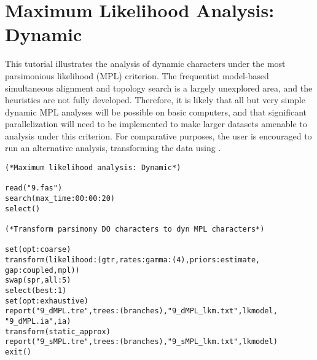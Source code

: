 
\section{Maximum Likelihood Analysis: Dynamic}{\label{tutorial15}}
This tutorial illustrates the analysis of dynamic characters under the most parsimonious likelihood 
(MPL) criterion. The frequentist model-based simultaneous alignment and topology search is a 
largely unexplored area, and the heuristics are not fully developed. Therefore, it is likely that all but 
very simple dynamic MPL analyses will be possible on basic computers, and that significant 
parallelization will need to be implemented to make larger datasets amenable to analysis under this 
criterion. For comparative purposes, the user is encouraged to run an alternative analysis, 
transforming the data using .

\begin{verbatim}
(*Maximum likelihood analysis: Dynamic*)

read("9.fas")
search(max_time:00:00:20)
select()

(*Transform parsimony DO characters to dyn MPL characters*)

set(opt:coarse)
transform(likelihood:(gtr,rates:gamma:(4),priors:estimate, 
gap:coupled,mpl))
swap(spr,all:5)
select(best:1)
set(opt:exhaustive)
report("9_dMPL.tre",trees:(branches),"9_dMPL_lkm.txt",lkmodel,
"9_dMPL.ia",ia)
transform(static_approx)
report("9_sMPL.tre",trees:(branches),"9_sMPL_lkm.txt",lkmodel)
exit()
\end{verbatim}


